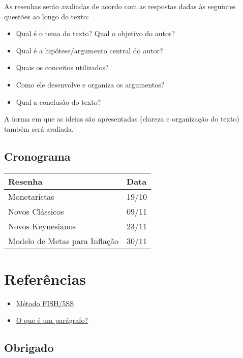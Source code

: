 \documentclass[11pt]{article}
\begin{document}
As resenhas serão avaliadas de acordo com as respostas dadas às seguintes questões
ao longo do texto:

\begin{itemize}
\item Qual é o tema do texto? Qual o objetivo do autor?
\item Qual é a hipótese/argumento central do autor?
\item Quais os conceitos utilizados?
\item Como ele desenvolve e organiza os argumentos?
\item Qual a conclusão do texto?
\end{itemize}


A forma em que as ideias são apresentadas (clareza e organização do texto) também
será avaliada.

\subsection*{Cronograma}
\label{sec:org594369b}

\begin{center}
\begin{tabular}{ll}
Resenha & Data\\
\hline
Monetaristas & 19/10\\
Novos Clássicos & 09/11\\
Novos Keynesianos & 23/11\\
Modelo de Metas para Inflação & 30/11\\
\hline
\end{tabular}
\end{center}

\section*{Referências}
\label{sec:org020b90b}

\begin{itemize}
\item \href{https://posgraduando.com/fish-qtcr-5ss-leitura-artigos/}{Método FISH/5SS}
\item \href{https://www.youtube.com/watch?v=vECQOychZyY}{O que é um parágrafo?}
\end{itemize}

\subsection*{Obrigado}
\label{sec:orgcbd429b}
\end{document}
